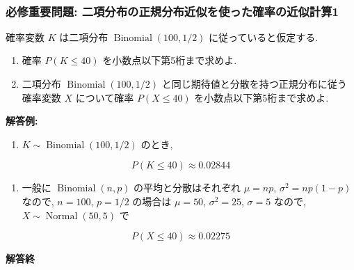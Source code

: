 \documentclass[10pt, a4paper,xelatex,ja=standard]{bxjsarticle}
\providecommand{\tightlist}{%
      \setlength{\itemsep}{0pt}\setlength{\parskip}{0pt}}
\newcommand\op{\operatorname}
\begin{document}
    \begin{center}
    \end{center}
    { \hspace*{\fill} \\}
    

    \hypertarget{ux5fc5ux4feeux91cdux8981ux554fux984c-ux4e8cux9805ux5206ux5e03ux306eux6b63ux898fux5206ux5e03ux8fd1ux4f3cux3092ux4f7fux3063ux305fux78baux7387ux306eux8fd1ux4f3cux8a08ux7b971}{%
\subsubsection{必修重要問題:
二項分布の正規分布近似を使った確率の近似計算1}\label{ux5fc5ux4feeux91cdux8981ux554fux984c-ux4e8cux9805ux5206ux5e03ux306eux6b63ux898fux5206ux5e03ux8fd1ux4f3cux3092ux4f7fux3063ux305fux78baux7387ux306eux8fd1ux4f3cux8a08ux7b971}}

確率変数 \(K\) は二項分布 \(\op{Binomial}(100, 1/2)\)
に従っていると仮定する.

\begin{enumerate}
\def\labelenumi{(\arabic{enumi})}
\item
  確率 \(P(K \le 40)\) を小数点以下第5桁まで求めよ.
\item
  二項分布 \(\op{Binomial}(100, 1/2)\)
  と同じ期待値と分散を持つ正規分布に従う確率変数 \(X\) について確率
  \(P(X \le 40)\) を小数点以下第5桁まで求めよ.
\end{enumerate}

    \textbf{解答例:}

\begin{enumerate}
\def\labelenumi{(\arabic{enumi})}
\tightlist
\item
  \(K\sim \op{Binomial}(100, 1/2)\) のとき,
\end{enumerate}

\[
P(K \le 40) \approx 0.02844
\]

\begin{enumerate}
\def\labelenumi{(\arabic{enumi})}
\setcounter{enumi}{1}
\tightlist
\item
  一般に \(\op{Binomial}(n, p)\) の平均と分散はそれぞれ \(\mu=np\),
  \(\sigma^2=np(1-p)\) なので, \(n=100\), \(p=1/2\) の場合は \(\mu=50\),
  \(\sigma^2=25\), \(\sigma=5\) なので, \(X\sim \op{Normal}(50, 5)\) で
\end{enumerate}

\[
P(X \le 40) \approx 0.02275
\]

\textbf{解答終}
\end{document}
